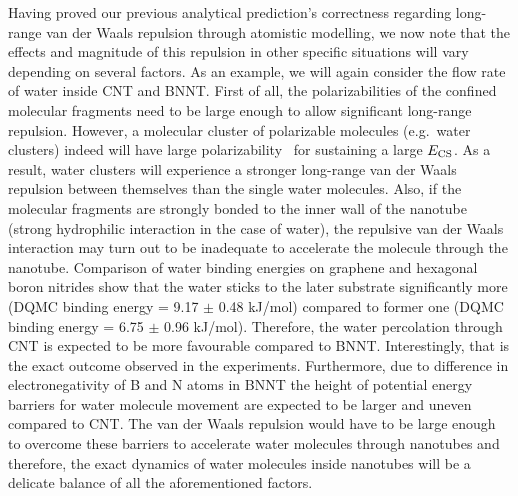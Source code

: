 \documentclass[aps,prl,groupaddress, twocolumn]{revtex4-1}  %
\begin{document}
Having proved our previous analytical prediction's correctness regarding long-range van der Waals repulsion through atomistic modelling, we now note that the effects and magnitude of this repulsion in other specific situations will vary depending on several factors. As an example, we will again consider the flow rate of water inside CNT and BNNT\@. First of all, the polarizabilities of the confined molecular fragments need to be large enough to allow significant long-range repulsion. However, a molecular cluster of polarizable molecules (e.g.\ water clusters) indeed will have large polarizability~\cite{hammond_2009} for sustaining a large $E_{\rm CS}$. As a result, water clusters will experience a stronger long-range van der Waals repulsion between themselves than the single water molecules. Also, if the molecular fragments are strongly bonded to the inner wall of the nanotube (strong hydrophilic interaction in the case of water), the repulsive van der Waals interaction may turn out to be inadequate to accelerate the molecule through the nanotube. Comparison of water binding energies on graphene and hexagonal boron nitrides show that the water sticks to the later substrate significantly more (DQMC binding energy = 9.17 $\pm$ 0.48 kJ/mol) compared to former one (DQMC binding energy = 6.75 $\pm$ 0.96 kJ/mol)\cite{Al-Hamdani_CNT_2017, Al-Hamdani_BNNT_2017}. Therefore, the water percolation through CNT is expected to be more favourable compared to BNNT\@. Interestingly, that is the exact outcome observed in the experiments\cite{secchi2016massive}. Furthermore, due to difference in electronegativity of B and N atoms in BNNT the height of potential energy barriers for water molecule movement are expected to be larger and uneven compared to CNT\@. The van der Waals repulsion would have to be large enough to overcome these barriers to accelerate water molecules through nanotubes and therefore, the exact dynamics of water molecules inside nanotubes will be a delicate balance of all the aforementioned factors.\\ 
\end{document}
